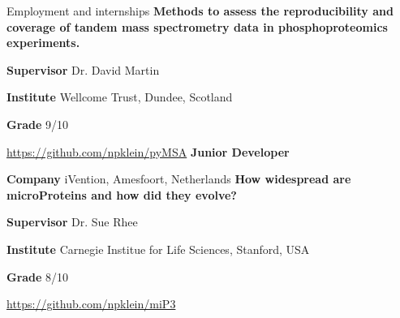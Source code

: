 \begin{rubric}{Employment and internships}
%
\textbf{Methods to assess the reproducibility and coverage of tandem mass spectrometry data in phosphoproteomics experiments.} \par
\textbf{Supervisor} Dr. David Martin \par
\textbf{Institute} Wellcome Trust, Dundee, Scotland \par
\textbf{Grade} 9/10 \par
\url{https://github.com/npklein/pyMSA}
%
%
\textbf{Junior Developer} \par
\textbf{Company} iVention, Amesfoort, Netherlands
%
%
\textbf{How widespread are microProteins and how did they evolve?} \par
\textbf{Supervisor} Dr. Sue Rhee \par
\textbf{Institute} Carnegie Institue for Life Sciences, Stanford, USA \par
\textbf{Grade} 8/10 \par
\url{https://github.com/npklein/miP3}


\end{rubric}
